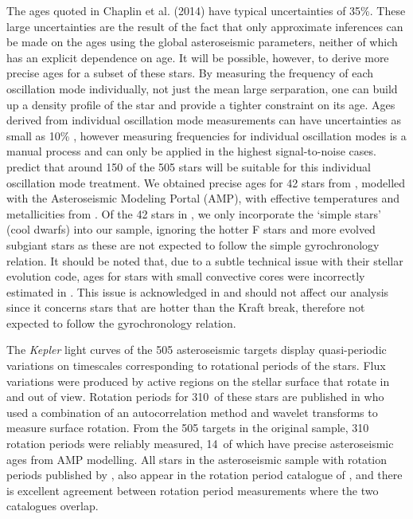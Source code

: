 \documentclass[11pt,preprint]{aastex}
\newcommand{\nastero}{310}
\newcommand{\nprecise}{14~}
\newcommand{\ngarcia}{310~}
\begin{document}
The ages quoted in Chaplin et al. (2014) have typical uncertainties of 35\%.
These large uncertainties are the result of the fact that only approximate inferences can be made on the ages using the global asteroseismic parameters, neither of which has an explicit dependence on age.
It will be possible, however, to derive more precise ages for a subset of these stars.
By measuring the frequency of each oscillation mode individually, not just the mean large serparation, one can build up a density profile of the star and provide a tighter constraint on its age.
Ages derived from individual oscillation mode measurements can have uncertainties as small as 10\% \citep{Brown1994, SilvaAguirre2013}, however measuring frequencies for individual oscillation modes is a manual process and can only be applied in the highest signal-to-noise cases.
\citet{Chaplin2014} predict that around 150 of the 505 stars will be suitable for this individual oscillation mode treatment.
We obtained precise ages for 42 stars from \citet{Metcalfe2014}, modelled with the Asteroseismic Modeling Portal (AMP), with effective temperatures and metallicities from \citet{Bruntt2012}.
Of the 42 stars in \citet{Metcalfe2014}, we only incorporate the `simple stars' (cool dwarfs) into our sample, ignoring the hotter F stars and more evolved subgiant stars as these are not expected to follow the simple gyrochronology relation.
It should be noted that, due to a subtle technical issue with their stellar evolution code, ages for stars with small convective cores were incorrectly estimated in \citet{Chaplin2014}.
This issue is acknowledged in \citet{Metcalfe2014} and should not affect our analysis since it concerns stars that are hotter than the Kraft break, therefore not expected to follow the gyrochronology relation.

The {\it Kepler} light curves of the 505 asteroseismic targets display quasi-periodic variations on timescales corresponding to rotational periods of the stars.
Flux variations were produced by active regions on the stellar surface that rotate in and out of view.
Rotation periods for \ngarcia of these stars are published in \citet{Garcia2014} who used a combination of an autocorrelation method and wavelet transforms to measure surface rotation.
From the 505 targets in the original sample, \nastero$~$rotation periods were reliably measured, \nprecise of which have precise asteroseismic ages from AMP modelling.
All stars in the asteroseismic sample with rotation periods published by \citet{McQuillan_2014}, also appear in the rotation period catalogue of \citet{Garcia2014}, and there is excellent agreement between rotation period measurements where the two catalogues overlap.
\end{document}
